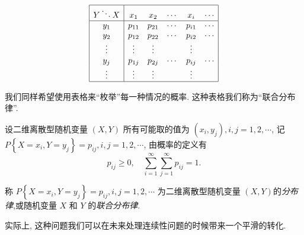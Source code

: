     $$
        \begin{array}{|c|ccccc|}
            \hline Y \ddots X & x_1     & x_2     & \cdots & x_i     & \cdots \\
            \hline y_1 & p_{11}  & p_{21}  & \cdots & p_{i 1} & \cdots \\
            y_2        & p_{12}  & p_{22}  & \cdots & p_{i 2} & \cdots \\
            \vdots     & \vdots  & \vdots  &        & \vdots  &        \\
            y_j        & p_{1 j} & p_{2 j} & \cdots & p_{i j} & \cdots \\
            \vdots     & \vdots  & \vdots  &        & \vdots  &        \\
            \hline
        \end{array}
    $$
    
    我们同样希望使用表格来``枚举''每一种情况的概率. 这种表格我们称为``联合分布律''. 

    \begin{definition}
      设二维离散型随机变量 $(X, Y)$ 所有可能取的值为 $\left(x_i, y_j\right), i, j=1,2, \cdots$, 记 $P\left\{X=x_i, Y=y_j\right\}=p_{i j}, i, j=1,2, \cdots$, 由概率的定义有
    $$
        p_{i j} \geq 0, \quad \sum_{i=1}^{\infty} \sum_{j=1}^{\infty} p_{i j}=1 .
    $$

    称 $P\left\{X=x_i, Y=y_j\right\}=p_{i j}, i, j=1,2, \cdots$ 为二维离散型随机变量 $(X, Y)$的\emph{分布律},或随机变量 $X$ 和 $Y$ 的\emph{联合分布律}.
    \end{definition}

    实际上, 这种问题我们可以在未来处理连续性问题的时候带来一个平滑的转化. 

